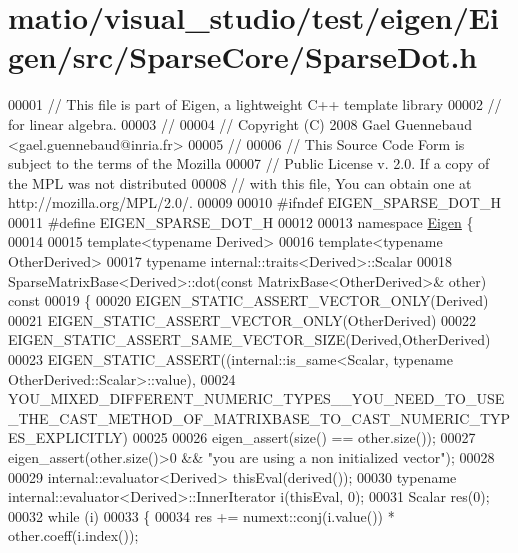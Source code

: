 \hypertarget{matio_2visual__studio_2test_2eigen_2_eigen_2src_2_sparse_core_2_sparse_dot_8h_source}{}\section{matio/visual\+\_\+studio/test/eigen/\+Eigen/src/\+Sparse\+Core/\+Sparse\+Dot.h}
\label{matio_2visual__studio_2test_2eigen_2_eigen_2src_2_sparse_core_2_sparse_dot_8h_source}

\begin{DoxyCode}
00001 \textcolor{comment}{// This file is part of Eigen, a lightweight C++ template library}
00002 \textcolor{comment}{// for linear algebra.}
00003 \textcolor{comment}{//}
00004 \textcolor{comment}{// Copyright (C) 2008 Gael Guennebaud <gael.guennebaud@inria.fr>}
00005 \textcolor{comment}{//}
00006 \textcolor{comment}{// This Source Code Form is subject to the terms of the Mozilla}
00007 \textcolor{comment}{// Public License v. 2.0. If a copy of the MPL was not distributed}
00008 \textcolor{comment}{// with this file, You can obtain one at http://mozilla.org/MPL/2.0/.}
00009 
00010 \textcolor{preprocessor}{#ifndef EIGEN\_SPARSE\_DOT\_H}
00011 \textcolor{preprocessor}{#define EIGEN\_SPARSE\_DOT\_H}
00012 
00013 \textcolor{keyword}{namespace }\hyperlink{namespace_eigen}{Eigen} \{ 
00014 
00015 \textcolor{keyword}{template}<\textcolor{keyword}{typename} Derived>
00016 \textcolor{keyword}{template}<\textcolor{keyword}{typename} OtherDerived>
00017 \textcolor{keyword}{typename} internal::traits<Derived>::Scalar
00018 SparseMatrixBase<Derived>::dot(\textcolor{keyword}{const} MatrixBase<OtherDerived>& other)\textcolor{keyword}{ const}
00019 \textcolor{keyword}{}\{
00020   EIGEN\_STATIC\_ASSERT\_VECTOR\_ONLY(Derived)
00021   EIGEN\_STATIC\_ASSERT\_VECTOR\_ONLY(OtherDerived)
00022   EIGEN\_STATIC\_ASSERT\_SAME\_VECTOR\_SIZE(Derived,OtherDerived)
00023   EIGEN\_STATIC\_ASSERT((internal::is\_same<Scalar, typename OtherDerived::Scalar>::value),
00024     
      YOU\_MIXED\_DIFFERENT\_NUMERIC\_TYPES\_\_YOU\_NEED\_TO\_USE\_THE\_CAST\_METHOD\_OF\_MATRIXBASE\_TO\_CAST\_NUMERIC\_TYPES\_EXPLICITLY)
00025 
00026   eigen\_assert(size() == other.size());
00027   eigen\_assert(other.size()>0 && \textcolor{stringliteral}{"you are using a non initialized vector"});
00028 
00029   internal::evaluator<Derived> thisEval(derived());
00030   \textcolor{keyword}{typename} internal::evaluator<Derived>::InnerIterator i(thisEval, 0);
00031   Scalar res(0);
00032   \textcolor{keywordflow}{while} (i)
00033   \{
00034     res += numext::conj(i.value()) * other.coeff(i.index());

\end{DoxyCode}
